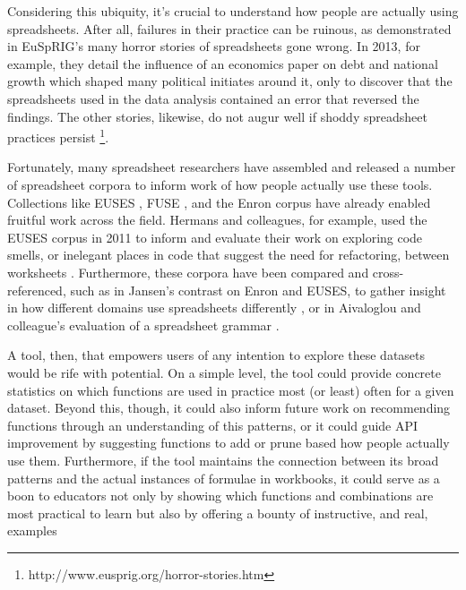 \documentclass[conference]{IEEEtran}
\begin{document}
	Considering this ubiquity, it's crucial to understand how people are actually
	using spreadsheets. After all, failures in their practice can be ruinous, as
	demonstrated in EuSpRIG's many horror stories of spreadsheets gone wrong. In
	2013, for example, they detail the influence of an economics paper on debt and
	national growth which shaped many political initiates around it, only to
	discover that the spreadsheets used in the data analysis contained an error
	that reversed the findings. The other stories, likewise, do not augur well if
	shoddy spreadsheet practices persist
	\footnote{http://www.eusprig.org/horror-stories.htm}. \par
	
	Fortunately, many spreadsheet researchers have assembled and released a number
	of spreadsheet corpora to inform work of how people actually use these tools.
	Collections like EUSES \cite{fisher2005euses}, FUSE \cite{barik2015fuse}, and
	the Enron corpus \cite{hermans2015enron} have already enabled fruitful work
	across the field. Hermans and colleagues, for example, used the EUSES corpus in
	2011 to inform and evaluate their work on exploring code smells, or inelegant
	places in code that suggest the need for refactoring, between worksheets
	\cite{hermans2012detecting}. Furthermore, these corpora have been compared
	and cross-referenced, such as in Jansen's contrast on Enron and EUSES, to
	gather insight in how different domains use spreadsheets differently 
	\cite{jansen2015enron}, or in Aivaloglou and colleague's evaluation of a
	spreadsheet grammar \cite{aivaloglou2015grammar}.\par
	
	A tool, then, that empowers users of any intention to explore these datasets
	would be rife with potential. On a simple level, the tool could provide
	concrete statistics on which functions are used in practice most (or least)
	often for a given dataset. Beyond this, though, it could also inform future
	work on recommending functions through an understanding of this patterns, or it
	could guide API improvement by suggesting functions to add or prune based how
	people actually use them. Furthermore, if the tool maintains the connection
	between its broad patterns and the actual instances of formulae in workbooks,
	it could serve as a boon to educators not only by showing which functions and
	combinations are most practical to learn but also by offering a bounty of
	instructive, and real, examples \par
	
\end{document}
